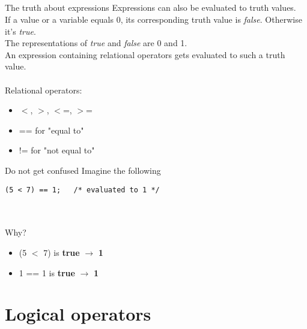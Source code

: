 \subsection{}
\begin{frame}{The truth about expressions}
	Expressions can also be evaluated to truth values.\\
	If a value or a variable equals 0, its corresponding truth value is \textit{false}. Otherwise it's \textit{true}.\\
	The representations of \textit{true} and \textit{false} are 0 and 1.\\
	An expression containing relational operators gets evaluated to such a truth value.\\
	\ \\Relational operators:
	\begin{itemize}
		\item $<$, $>$, $<$=, $>$=
		\item == for "equal to"
		\item != for "not equal to"
	\end{itemize}
\end{frame}
\begin{frame}[fragile]{Do not get confused}
	Imagine the following
	\begin{lstlisting}[numbers=none]
(5 < 7) == 1;	/* evaluated to 1 */
\end{lstlisting}
\ \\\ \\Why?
\begin{itemize}
	\item<2-> (5 $<$ 7) is \textbf{true} $\rightarrow$ \textbf{1}
	\item<3-> 1 == 1 is \textbf{true} $\rightarrow$ \textbf{1}
\end{itemize}
\end{frame}
\section{Logical operators}
